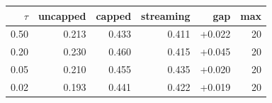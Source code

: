 \begin{tabular}{rrrrrr}
\toprule
$\tau$ & uncapped & capped & streaming & gap & max \\
\midrule
0.50 & 0.213 & 0.433 & 0.411 & +0.022 & 20 \\
0.20 & 0.230 & 0.460 & 0.415 & +0.045 & 20 \\
0.05 & 0.210 & 0.455 & 0.435 & +0.020 & 20 \\
0.02 & 0.193 & 0.441 & 0.422 & +0.019 & 20 \\
\bottomrule
\end{tabular}